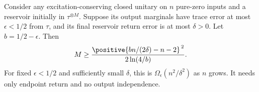 \begin{theorem}\label{thm:transport}
Consider any excitation-conserving closed unitary on $n$ pure-zero inputs and a reservoir initially in $\tau^{\otimes M}$. Suppose its output marginals have trace error at most $\epsilon<1/2$ from $\tau$, and its final reservoir return error is at most $\delta>0$. Let $b=1/2-\epsilon$. Then
\begin{equation}
 M\ge
 \frac{\positive{bn/(2\delta)-n-2}^{\,2}}{2\ln(4/b)}.
 \label{eq:transport}
\end{equation}
For fixed $\epsilon<1/2$ and sufficiently small $\delta$, this is $\Omega_\epsilon(n^2/\delta^2)$ as $n$ grows. It needs only endpoint return and no output independence.
\end{theorem}

